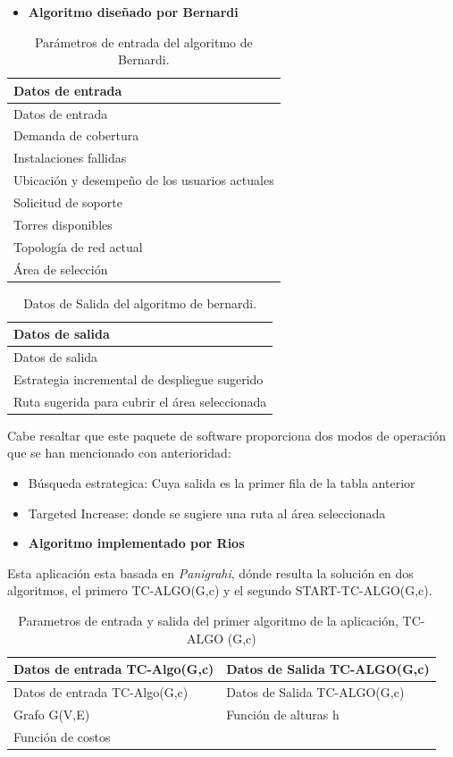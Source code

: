 \documentclass[]{article}
\providecommand{\tightlist}{%
  \setlength{\itemsep}{0pt}\setlength{\parskip}{0pt}}
\begin{document}
\begin{itemize}
\tightlist
\item
  \textbf{Algoritmo diseñado por Bernardi}
\end{itemize}

\begin{longtable}[]{@{}l@{}}
\caption{Parámetros de entrada del algoritmo de
Bernardi.}\tabularnewline
\toprule
Datos de entrada\tabularnewline
\midrule
\endfirsthead
\toprule
Datos de entrada\tabularnewline
\midrule
\endhead
Demanda de cobertura\tabularnewline
Instalaciones fallidas\tabularnewline
Ubicación y desempeño de los usuarios actuales\tabularnewline
Solicitud de soporte\tabularnewline
Torres disponibles\tabularnewline
Topología de red actual\tabularnewline
Área de selección\tabularnewline
\bottomrule
\end{longtable}

\begin{longtable}[]{@{}l@{}}
\caption{Datos de Salida del algoritmo de bernardi.}\tabularnewline
\toprule
Datos de salida\tabularnewline
\midrule
\endfirsthead
\toprule
Datos de salida\tabularnewline
\midrule
\endhead
Estrategia incremental de despliegue sugerido\tabularnewline
Ruta sugerida para cubrir el área seleccionada\tabularnewline
\bottomrule
\end{longtable}

Cabe resaltar que este paquete de software proporciona dos modos de
operación que se han mencionado con anterioridad:

\begin{itemize}
\item
  Búsqueda estrategica: Cuya salida es la primer fila de la tabla
  anterior
\item
  Targeted Increase: donde se sugiere una ruta al área seleccionada
\item
  \textbf{Algoritmo implementado por Rios}
\end{itemize}

Esta aplicación esta basada en \emph{Panigrahi}, dónde resulta la
solución en dos algoritmos, el primero TC-ALGO(G,c) y el segundo
START-TC-ALGO(G,c).

\begin{longtable}[]{@{}ll@{}}
\caption{Parametros de entrada y salida del primer algoritmo de la
aplicación, TC-ALGO (G,c)}\tabularnewline
\toprule
Datos de entrada TC-Algo(G,c) & Datos de Salida
TC-ALGO(G,c)\tabularnewline
\midrule
\endfirsthead
\toprule
Datos de entrada TC-Algo(G,c) & Datos de Salida
TC-ALGO(G,c)\tabularnewline
\midrule
\endhead
Grafo G(V,E) & Función de alturas h\tabularnewline
Función de costos &\tabularnewline
\bottomrule
\end{longtable}
\end{document}
